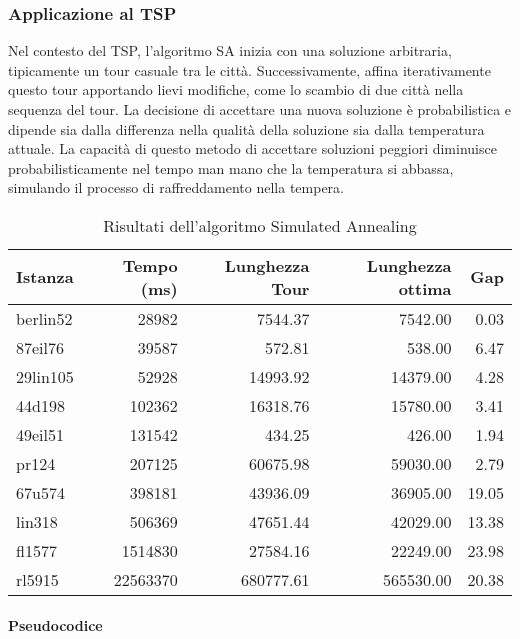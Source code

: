 \subsubsection{Applicazione al \gls{TSP}}

Nel contesto del \gls{TSP}, l'algoritmo SA inizia con una soluzione arbitraria, tipicamente un tour casuale tra le città. Successivamente, affina iterativamente questo tour apportando lievi modifiche, come lo scambio di due città nella sequenza del tour. La decisione di accettare una nuova soluzione è probabilistica e dipende sia dalla differenza nella qualità della soluzione sia dalla temperatura attuale. La capacità di questo metodo di accettare soluzioni peggiori diminuisce probabilisticamente nel tempo man mano che la temperatura si abbassa, simulando il processo di raffreddamento nella tempera.


\begin{table}[H] 
  \centering
	\caption{Risultati dell'algoritmo Simulated Annealing}
	\begin{tabular}{lrrrr}
		\toprule
		Istanza  & Tempo (ms) & Lunghezza Tour & Lunghezza ottima & Gap   \\
		\midrule
		berlin52 & 28982      & 7544.37        & 7542.00          & 0.03  \\
		87eil76  & 39587      & 572.81         & 538.00           & 6.47  \\
		29lin105 & 52928      & 14993.92       & 14379.00         & 4.28  \\
		44d198   & 102362     & 16318.76       & 15780.00         & 3.41  \\
		49eil51  & 131542     & 434.25         & 426.00           & 1.94  \\
		pr124    & 207125     & 60675.98       & 59030.00         & 2.79  \\
		67u574   & 398181     & 43936.09       & 36905.00         & 19.05 \\
		lin318   & 506369     & 47651.44       & 42029.00         & 13.38 \\
		fl1577   & 1514830    & 27584.16       & 22249.00         & 23.98 \\
		rl5915   & 22563370   & 680777.61      & 565530.00        & 20.38 \\
		\bottomrule
	\end{tabular}
\end{table}

\paragraph{Pseudocodice}


